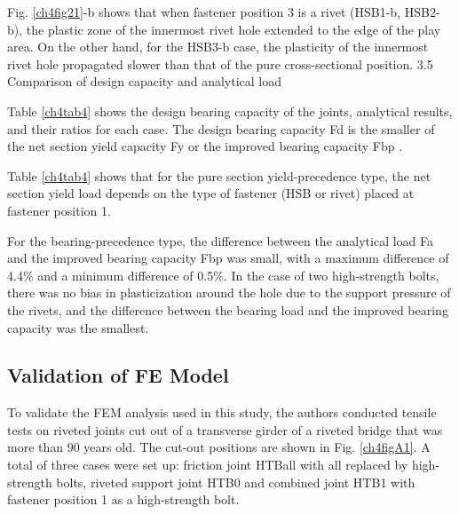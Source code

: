 Fig. \ref{ch4fig21}-b shows that when fastener position 3 is a rivet (HSB1-b, HSB2-b), the plastic zone of the innermost rivet hole extended to the edge of the play area. On the other hand, for the HSB3-b case, the plasticity of the innermost rivet hole propagated slower than that of the pure cross-sectional position.
 3.5 Comparison of design capacity and analytical load

Table \ref{ch4tab4} shows the design bearing capacity of the joints, analytical results, and their ratios for each case. The design bearing capacity Fd is the smaller of the net section yield capacity Fy or the improved bearing capacity Fbp .

Table \ref{ch4tab4} shows that for the pure section yield-precedence type, the net section yield load depends on the type of fastener (HSB or rivet) placed at fastener position 1.

For the bearing-precedence type, the difference between the analytical load Fa and the improved bearing capacity Fbp was small, with a maximum difference of 4.4\% and a minimum difference of 0.5\%. In the case of two high-strength bolts, there was no bias in plasticization around the hole due to the support pressure of the rivets, and the difference between the bearing load and the improved bearing capacity was the smallest.


\subsection{Validation of FE Model}

To validate the FEM analysis used in this study, the authors conducted tensile tests on riveted joints cut out of a transverse girder of a riveted bridge that was more than 90 years old. The cut-out positions are shown in Fig. \ref{ch4figA1}.
A total of three cases were set up: friction joint HTBall with all replaced by high-strength bolts, riveted support joint HTB0 and combined joint HTB1 with fastener position 1 as a high-strength bolt.


